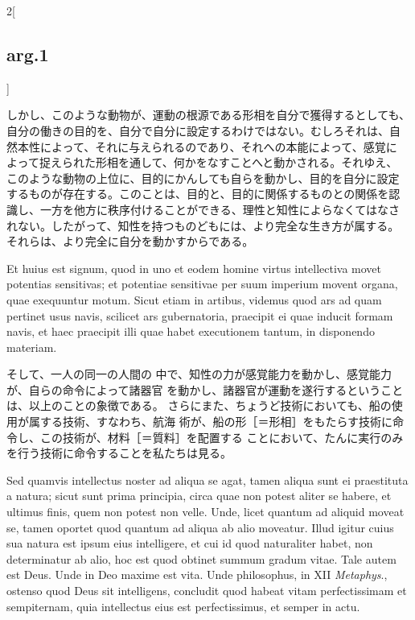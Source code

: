 \documentclass[paper=a4paper,fontsize=10pt,jafontsize=9pt,titlepage]{jlreq}
\begin{document}
\begin{paracol}{2}[\subsection{arg.1}]
\switchcolumn

しかし、このような動物が、運動の根源である形相を自分で獲得するとしても、
 自分の働きの目的を、自分で自分に設定するわけではない。むしろそれは、自
 然本性によって、それに与えられるのであり、それへの本能によって、感覚に
 よって捉えられた形相を通して、何かをなすことへと動かされる。それゆえ、
 このような動物の上位に、目的にかんしても自らを動かし、目的を自分に設定
 するものが存在する。このことは、目的と、目的に関係するものとの関係を認
 識し、一方を他方に秩序付けることができる、理性と知性によらなくてはなさ
 れない。したがって、知性を持つものどもには、より完全な生き方が属する。
 それらは、より完全に自分を動かすからである。

\switchcolumn*


Et huius est signum, quod in uno et eodem
homine virtus intellectiva movet potentias sensitivas; et potentiae
sensitivae per suum imperium movent organa, quae exequuntur motum. Sicut
etiam in artibus, videmus quod ars ad quam pertinet usus navis, scilicet
ars gubernatoria, praecipit ei quae inducit formam navis, et haec
praecipit illi quae habet executionem tantum, in disponendo
materiam.

\switchcolumn

そして、一人の同一の人間の
 中で、知性の力が感覚能力を動かし、感覚能力が、自らの命令によって諸器官
 を動かし、諸器官が運動を遂行するということは、以上のことの象徴である。
さらにまた、ちょうど技術においても、船の使用が属する技術、すなわち、航海
 術が、船の形［＝形相］をもたらす技術に命令し、この技術が、材料［＝質料］を配置する
 ことにおいて、たんに実行のみを行う技術に命令することを私たちは見る。

\switchcolumn*


Sed quamvis intellectus noster ad aliqua se agat, tamen aliqua
sunt ei praestituta a natura; sicut sunt prima principia, circa quae non
potest aliter se habere, et ultimus finis, quem non potest non
velle. Unde, licet quantum ad aliquid moveat se, tamen oportet quod
quantum ad aliqua ab alio moveatur. Illud igitur cuius sua natura est
ipsum eius intelligere, et cui id quod naturaliter habet, non
determinatur ab alio, hoc est quod obtinet summum gradum vitae. Tale
autem est Deus. Unde in Deo maxime est vita. Unde philosophus, in XII
{\itshape Metaphys}., ostenso quod Deus sit intelligens, concludit quod habeat
vitam perfectissimam et sempiternam, quia intellectus eius est
perfectissimus, et semper in actu.

\switchcolumn


\end{paracol}
\end{document}
